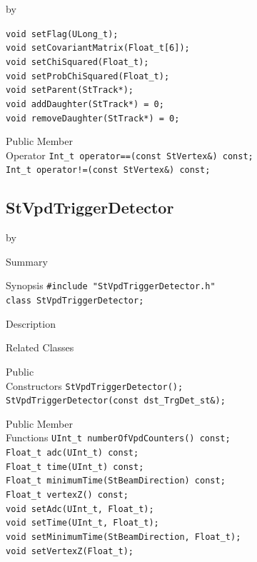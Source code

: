 \documentclass[twoside]{article}
\newcommand{\entrylabel}[1]{\mbox{\textbf{{#1}}}\hfil}%
\newenvironment{entry}
{\begin{list}{}%
    {\renewcommand{\makelabel}{\entrylabel}%
     \setlength{\labelwidth}{90pt}%
     \setlength{\leftmargin}{\labelwidth}
     \advance\leftmargin by \labelsep%
      }%
    }%
  {\end{list}}
\newcommand{\Entrylabel}[1]%
{\raisebox{0pt}[1ex][0pt]{\makebox[\labelwidth][l]%
    {\parbox[t]{\labelwidth}{\hspace{0pt}\textbf{{#1}}}}}}
\newenvironment{Entry}%
{\renewcommand{\entrylabel}{\Entrylabel}\begin{entry}}%
  {\end{entry}}
\begin{document}
\begin{Entry}
    \verb+void setFlag(ULong_t);+\\
    \verb+void setCovariantMatrix(Float_t[6]);+\\
    \verb+void setChiSquared(Float_t);+\\
    \verb+void setProbChiSquared(Float_t);+\\
    \verb+void setParent(StTrack*);+\\
    \verb+void addDaughter(StTrack*) = 0;+\\
    \verb+void removeDaughter(StTrack*) = 0;+\\

\item[Public Member\\ Operator]
    \verb+Int_t operator==(const StVertex&) const;+\\
    \verb+Int_t operator!=(const StVertex&) const;+\\
\end{Entry}
\clearpage


\subsection{StVpdTriggerDetector}
\label{sec:StVpdTriggerDetector}
\begin{Entry}
\item[Summary]
\item[Synopsis]
    \verb+#include "StVpdTriggerDetector.h"+\\
    \verb+class StVpdTriggerDetector;+\\
\item[Description]
\item[Related Classes]
\item[Public\\ Constructors]
    \verb+StVpdTriggerDetector();+\\
    \verb+StVpdTriggerDetector(const dst_TrgDet_st&);+\\
\item[Public Member\\ Functions]
    \verb+UInt_t numberOfVpdCounters() const;+\\
    \verb+Float_t adc(UInt_t) const;+\\
    \verb+Float_t time(UInt_t) const;+\\
    \verb+Float_t minimumTime(StBeamDirection) const;+\\
    \verb+Float_t vertexZ() const;+\\
    \verb+void setAdc(UInt_t, Float_t);+\\
    \verb+void setTime(UInt_t, Float_t);+\\
    \verb+void setMinimumTime(StBeamDirection, Float_t);+\\
    \verb+void setVertexZ(Float_t);+\\
\end{Entry}
\clearpage
\end{document}
